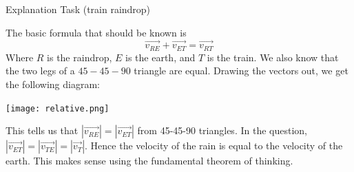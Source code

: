 \documentclass[11pt]{scrartcl}
\begin{document}
\begin{example}
  Explanation Task (train raindrop)
\end{example}
\begin{soln}
  The basic formula that should be known is
  $$\overrightarrow{v_{RE}}+\overrightarrow{v_{ET}}=\overrightarrow{v_{RT}}$$
  Where $R$ is the raindrop, $E$ is the earth, and $T$ is the train. We also know that the two legs of a $45-45-90$ triangle are equal.
  Drawing the vectors out, we get the following diagram:
  \begin{center}\texttt{[image: relative.png]}\end{center}
  This tells us that $|\overrightarrow{v_{RE}}|=|\overrightarrow{v_{ET}}|$ from 45-45-90 triangles. In the question, $|\overrightarrow{v_{ET}}|=|\overrightarrow{v_{TE}}|=|\overrightarrow{v_T}|$.
  Hence the velocity of the rain is equal to the velocity of the earth. This makes sense using the fundamental theorem of thinking.
\end{soln}
\end{document}
